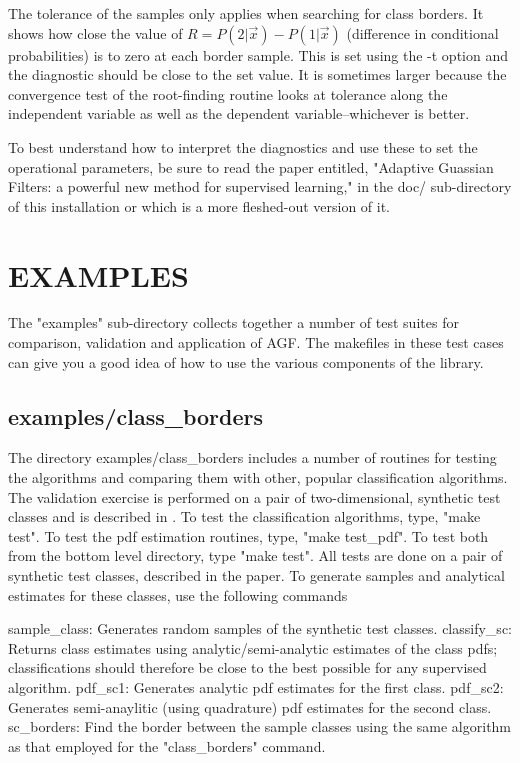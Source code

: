 \documentclass[12pt]{article}
\begin{document}
  The tolerance of the samples only applies when searching for class borders.  It shows how close the value of $R=P(2|\vec x)-P(1|\vec x)$ (difference in conditional probabilities) is to zero at each border sample.  This is set using the -t option and the diagnostic should be close to the set value.  It is sometimes larger because the convergence test of the root-finding routine looks at tolerance along the independent variable as well as the dependent variable--whichever is better.

  To best understand how to interpret the diagnostics and use these to set the operational parameters, be sure to read the paper entitled, "Adaptive Guassian Filters: a powerful new method for supervised learning," in the doc/ sub-directory of this installation or \citet{Mills_2011} which is a more fleshed-out version of it.


\section{EXAMPLES}

  The "examples" sub-directory collects together a number of test suites for comparison, validation and application of AGF.  The makefiles in these test cases can give you a good idea of how to use the various components of the library.

\subsection{examples/class_borders}

The directory examples/class_borders includes a number of routines for testing the algorithms and comparing them with other, popular classification algorithms.  The validation exercise is performed on a pair of two-dimensional, synthetic test classes and is described in \citet{Mills_2011}.  To test the classification algorithms, type, "make test".  To test the pdf estimation routines, type, "make test_pdf".  To test both from the bottom level directory, type "make test".  All tests are done on a pair of synthetic test classes, described in the paper.  To generate samples and analytical estimates for these classes, use the following commands

  sample_class:	Generates random samples of the synthetic test classes.
  classify_sc:	Returns class estimates using analytic/semi-analytic estimates of the class pdfs; classifications should therefore be close to the best possible for any supervised algorithm.
  pdf_sc1:	Generates analytic pdf estimates for the first class.
  pdf_sc2:	Generates semi-anaylitic (using quadrature) pdf estimates for the second class.
  sc_borders:	Find the border between the sample classes using the same algorithm as that employed for the "class_borders" command.
\end{document}
